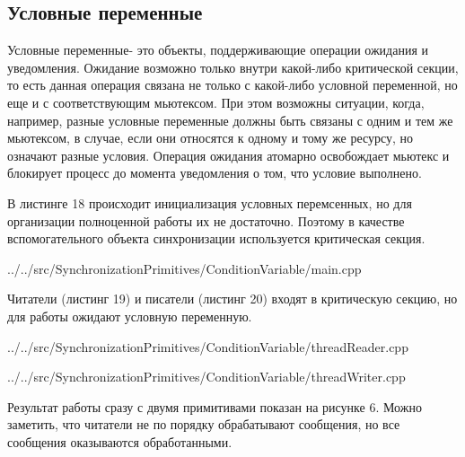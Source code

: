 \documentclass[a4paper, 12pt]{article}		%
\begin{document}
\newpage
\subsection{Условные переменные}

Условные переменные- это объекты, поддерживающие операции ожидания и уведомления. Ожидание возможно только внутри какой-либо критической секции, то есть данная операция связана не только с какой-либо условной переменной, но еще и с соответствующим мьютексом. При этом возможны ситуации, когда, например, разные условные переменные должны быть связаны с одним и тем же мьютексом, в случае, если они относятся к одному и тому же ресурсу, но означают разные условия. Операция ожидания атомарно освобождает мьютекс и блокирует процесс до момента уведомления о том, что условие выполнено.

В листинге 18 происходит инициализация условных перемсенных, но для организации полноценной работы их не достаточно. Поэтому в качестве вспомогательного объекта синхронизации используется критическая секция.


{../../src/SynchronizationPrimitives/ConditionVariable/main.cpp}

Читатели (листинг 19) и писатели (листинг 20) входят в критическую секцию, но для работы ожидают условную переменную.


{../../src/SynchronizationPrimitives/ConditionVariable/threadReader.cpp}


{../../src/SynchronizationPrimitives/ConditionVariable/threadWriter.cpp}
\newpage

Результат работы сразу с двумя примитивами показан на рисунке 6. Можно заметить, что читатели не по порядку обрабатывают сообщения, но все сообщения оказываются обработанными.
\end{document}
